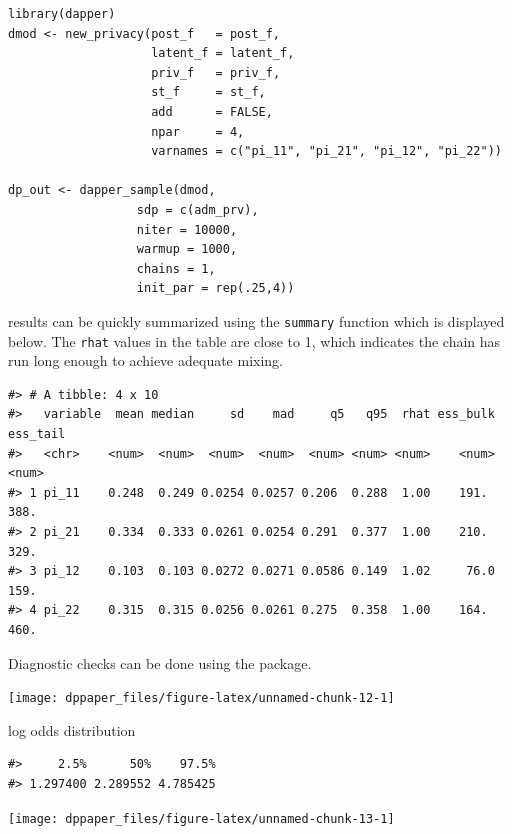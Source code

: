 \begin{verbatim}
library(dapper)
dmod <- new_privacy(post_f   = post_f,
                    latent_f = latent_f,
                    priv_f   = priv_f,
                    st_f     = st_f,
                    add      = FALSE,
                    npar     = 4,
                    varnames = c("pi_11", "pi_21", "pi_12", "pi_22"))
                  
dp_out <- dapper_sample(dmod,
                  sdp = c(adm_prv),
                  niter = 10000,
                  warmup = 1000,
                  chains = 1,
                  init_par = rep(.25,4))
\end{verbatim}

results can be quickly summarized using the \texttt{summary} function which is
displayed below. The \texttt{rhat} values in the table are close to 1, which indicates
the chain has run long enough to achieve adequate mixing.

\begin{verbatim}
#> # A tibble: 4 x 10
#>   variable  mean median     sd    mad     q5   q95  rhat ess_bulk ess_tail
#>   <chr>    <num>  <num>  <num>  <num>  <num> <num> <num>    <num>    <num>
#> 1 pi_11    0.248  0.249 0.0254 0.0257 0.206  0.288  1.00    191.      388.
#> 2 pi_21    0.334  0.333 0.0261 0.0254 0.291  0.377  1.00    210.      329.
#> 3 pi_12    0.103  0.103 0.0272 0.0271 0.0586 0.149  1.02     76.0     159.
#> 4 pi_22    0.315  0.315 0.0256 0.0261 0.275  0.358  1.00    164.      460.
\end{verbatim}

Diagnostic checks can be done using the  package.

\begin{center}\texttt{[image: dppaper\_files/figure-latex/unnamed-chunk-12-1]} \end{center}

log odds distribution

\begin{verbatim}
#>     2.5%      50%    97.5% 
#> 1.297400 2.289552 4.785425
\end{verbatim}

\begin{center}\texttt{[image: dppaper\_files/figure-latex/unnamed-chunk-13-1]} \end{center}

